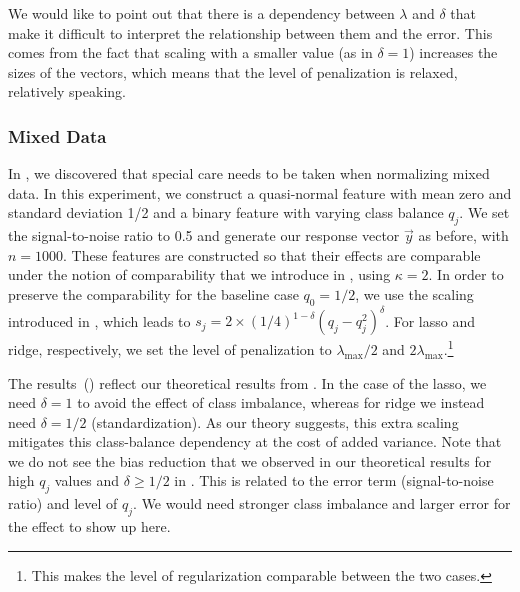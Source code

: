 We would like to point out that there is a dependency between \(\lambda\) and \(\delta\)
that make it difficult to interpret the relationship between them and the error. This comes
from the fact that scaling with a smaller value (as in \(\delta = 1\)) increases the sizes
of the vectors, which means that the level of penalization is relaxed, relatively speaking.

\subsubsection{Mixed Data}\label{sec:experiments-mixed-data}

In , we discovered that special care needs to be taken when
normalizing mixed data. In this experiment, we construct a quasi-normal feature with mean
zero and standard deviation 1/2 and a binary feature with varying class balance \(q_j\). We
set the signal-to-noise ratio to 0.5 and generate our response vector \(\vec{y}\) as
before, with \(n = \num{1000}\). These features are constructed so that their effects are
comparable under the notion of comparability that we introduce in ,
using \(\kappa = 2\). In order to preserve the comparability for the baseline case \(q_0 =
1/2\), we use the scaling introduced in , which leads to \(s_j = 2
\times (1/4)^{1-\delta}(q_j-q_j^2)^\delta\). For lasso and ridge, respectively, we set the
level of penalization to \(\lambda_\text{max}/2\) and
\(2\lambda_\text{max}\).\footnote{This makes the level of regularization comparable between
  the two cases.}

The results~() reflect our theoretical results from
. In the case of the lasso, we need \(\delta =1\) to avoid the effect of
class imbalance, whereas for ridge we instead need \(\delta =1/2\) (standardization). As
our theory suggests, this extra scaling mitigates this class-balance dependency at the cost
of added variance. Note that we do not see the bias reduction that we observed in our
theoretical results for high \(q_j\) values and \(\delta \geq 1/2\) in
. This is related to the error term (signal-to-noise
ratio) and level of \(q_j\). We would need stronger class imbalance and larger error for
the effect to show up here.

